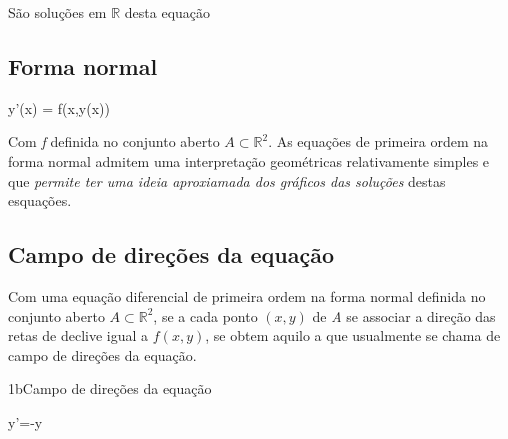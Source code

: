 \documentclass["AM3C-Slides_annotations.tex"]{subfiles}
\begin{document}
\begin{sectionBox}
\begin{multicols}{2}
\begin{exampleBox}
      São soluções em \(\mathbb{R}\) desta equação
    \end{exampleBox}
  \end{multicols}

  \subsection*{Forma normal}
  \begin{BM}
    y'(x) = f(x,y(x))
  \end{BM}
  Com \textit{f} definida no conjunto aberto \(A\subset\mathbb{R}^2\).
  As equações de primeira ordem na forma normal admitem uma interpretação geométricas relativamente simples e que \emph{permite ter uma ideia aproxiamada dos gráficos das soluções} destas esquações.
  
  \subsection*{Campo de direções da equação}
  Com uma equação diferencial de primeira ordem na forma normal definida no conjunto aberto \(A\subset\mathbb{R}^2\), se a cada ponto \((x,y)\) de \textit{A} se associar a direção das retas de declive igual a \(f(x,y)\), se obtem aquilo a que usualmente se chama de campo de direções da equação.

  \begin{exampleBox}1b{Campo de direções da equação} %
    \begin{BM}
      y'=-y
    \end{BM}
    \begin{center}
    \end{center}
    
  \end{exampleBox}
\end{sectionBox}
\end{document}
